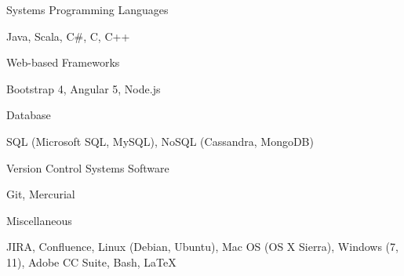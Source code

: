 \begin{cventries}
  \cventry
    {Systems}
    {Programming Languages}
    { }
    { }
    {
      \begin{cvitems}
        \item {Java, Scala, C\#, C, C++}
      \end{cvitems}
    }
  \cventry
    {Web-based Frameworks}
    { }
    { }
    { }
    {
      \begin{cvitems}
        \item {Bootstrap 4, Angular 5, Node.js}
      \end{cvitems}
    }
  \cventry
    {Database}
    { }
    { }
    { }
    {
      \begin{cvitems}
        \item {SQL (Microsoft SQL, MySQL), NoSQL (Cassandra, MongoDB)}
      \end{cvitems}
    }
  \cventry
    {Version Control Systems}
    {Software}
    { }
    { }
    {
      \begin{cvitems}
        \item {Git, Mercurial}
      \end{cvitems}
    }
  \cventry
    {Miscellaneous}
    { }
    { }
    { }
    {
      \begin{cvitems}
        \item {JIRA, Confluence, Linux (Debian, Ubuntu), Mac OS (OS X Sierra), Windows (7, 11), Adobe CC Suite, Bash, LaTeX}
      \end{cvitems}
    }
\end{cventries}